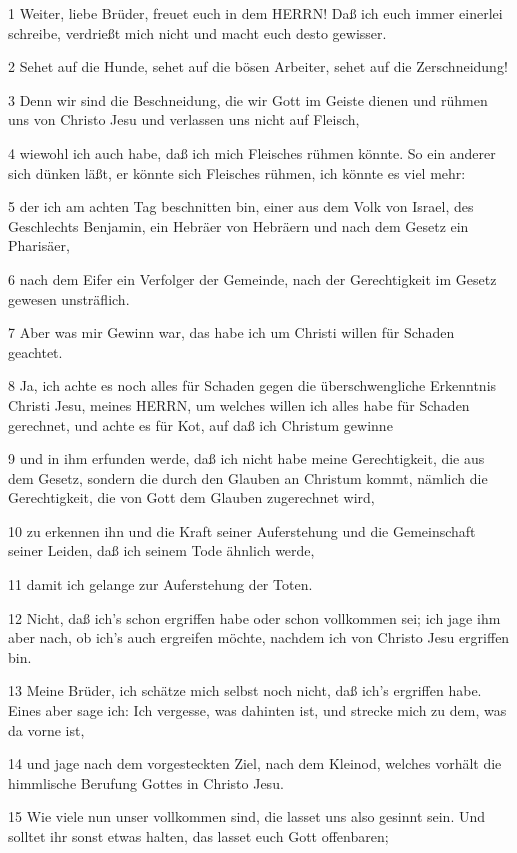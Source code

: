 \par 1 Weiter, liebe Brüder, freuet euch in dem HERRN! Daß ich euch immer einerlei schreibe, verdrießt mich nicht und macht euch desto gewisser.
\par 2 Sehet auf die Hunde, sehet auf die bösen Arbeiter, sehet auf die Zerschneidung!
\par 3 Denn wir sind die Beschneidung, die wir Gott im Geiste dienen und rühmen uns von Christo Jesu und verlassen uns nicht auf Fleisch,
\par 4 wiewohl ich auch habe, daß ich mich Fleisches rühmen könnte. So ein anderer sich dünken läßt, er könnte sich Fleisches rühmen, ich könnte es viel mehr:
\par 5 der ich am achten Tag beschnitten bin, einer aus dem Volk von Israel, des Geschlechts Benjamin, ein Hebräer von Hebräern und nach dem Gesetz ein Pharisäer,
\par 6 nach dem Eifer ein Verfolger der Gemeinde, nach der Gerechtigkeit im Gesetz gewesen unsträflich.
\par 7 Aber was mir Gewinn war, das habe ich um Christi willen für Schaden geachtet.
\par 8 Ja, ich achte es noch alles für Schaden gegen die überschwengliche Erkenntnis Christi Jesu, meines HERRN, um welches willen ich alles habe für Schaden gerechnet, und achte es für Kot, auf daß ich Christum gewinne
\par 9 und in ihm erfunden werde, daß ich nicht habe meine Gerechtigkeit, die aus dem Gesetz, sondern die durch den Glauben an Christum kommt, nämlich die Gerechtigkeit, die von Gott dem Glauben zugerechnet wird,
\par 10 zu erkennen ihn und die Kraft seiner Auferstehung und die Gemeinschaft seiner Leiden, daß ich seinem Tode ähnlich werde,
\par 11 damit ich gelange zur Auferstehung der Toten.
\par 12 Nicht, daß ich's schon ergriffen habe oder schon vollkommen sei; ich jage ihm aber nach, ob ich's auch ergreifen möchte, nachdem ich von Christo Jesu ergriffen bin.
\par 13 Meine Brüder, ich schätze mich selbst noch nicht, daß ich's ergriffen habe. Eines aber sage ich: Ich vergesse, was dahinten ist, und strecke mich zu dem, was da vorne ist,
\par 14 und jage nach dem vorgesteckten Ziel, nach dem Kleinod, welches vorhält die himmlische Berufung Gottes in Christo Jesu.
\par 15 Wie viele nun unser vollkommen sind, die lasset uns also gesinnt sein. Und solltet ihr sonst etwas halten, das lasset euch Gott offenbaren;
